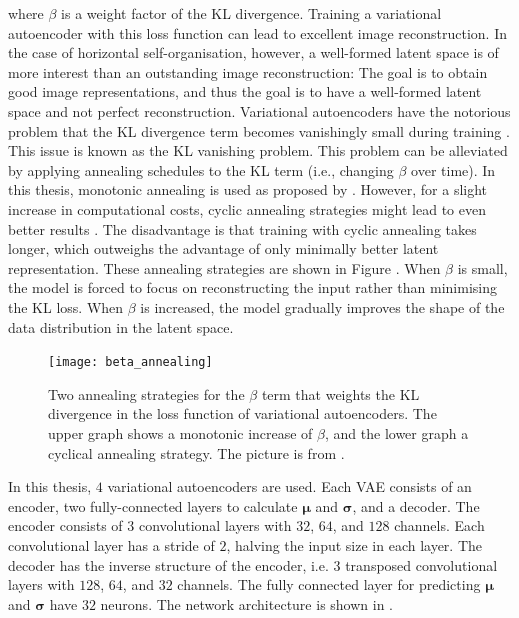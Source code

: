 where $\beta$ is a weight factor of the KL divergence. Training a variational autoencoder with this loss function can lead to excellent image reconstruction.
In the case of horizontal self-organisation, however, a well-formed latent space is of more interest than an outstanding image reconstruction: The goal is to obtain good image representations, and thus the goal is to have a well-formed latent space and not perfect reconstruction.
Variational autoencoders have the notorious problem that the KL divergence term becomes vanishingly small during training . This issue is known as the KL vanishing problem.
This problem can be alleviated by applying annealing schedules to the KL term (i.e., changing $\beta$ over time).
In this thesis, monotonic annealing is used as proposed by .
However, for a slight increase in computational costs, cyclic annealing strategies might lead to even better results .
The disadvantage is that training with cyclic annealing takes longer, which outweighs the advantage of only minimally better latent representation.
These annealing strategies are shown in Figure . When $\beta$ is small, the model is forced to focus on reconstructing the input rather than minimising the KL loss.
When $\beta$ is increased, the model gradually improves the shape of the data distribution in the latent space.

\begin{figure}[h]
    \centering
    \texttt{[image: beta\_annealing]}
    \caption[Annealing strategy of the KL weight term in variational autoencoders]{Two annealing strategies for the $\beta$ term that weights the KL divergence in the loss function of variational autoencoders. The upper graph shows a monotonic increase of $\beta$, and the lower graph a cyclical annealing strategy. The picture is from \cite{Fu_Li_Liu_Gao_Celikyilmaz_Carin_2019}.}
\end{figure}

In this thesis, $4$ variational autoencoders are used. Each VAE consists of an encoder, two fully-connected layers to calculate $\boldsymbol{\mu}$ and $\boldsymbol{\sigma}$, and a decoder.
The encoder consists of $3$  convolutional layers with $32$, $64$, and $128$ channels. Each convolutional layer has a stride of $2$, halving the input size in each layer.
The decoder has the inverse structure of the encoder, i.e. $3$ transposed convolutional layers with $128$, $64$, and $32$ channels.
The fully connected layer for predicting $\boldsymbol{\mu}$ and $\boldsymbol{\sigma}$ have $32$ neurons.
The network architecture is shown in .


